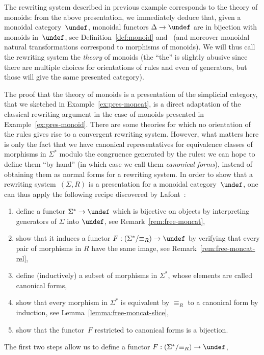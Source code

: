 \documentclass[submission,copyright,creativecommons]{eptcs}
\let\C\undef
\theoremstyle{definition}
\theoremstyle{remark}
\begin{document}
The rewriting system described in previous example corresponds to the theory of
monoids: from the above presentation, we immediately deduce that, given a
monoidal category~$\C$, monoidal functors $\Delta\to\C$ are in bijection with
monoids in~$\C$, see Definition~\ref{def:monoid} and~\cite{maclane:cwm} (and
moreover monoidal natural transformations correspond to morphisms of
monoids). We will thus call the rewriting system the \emph{theory} of monoids
(the ``the'' is slightly abusive since there are multiple choices for
orientations of rules and even of generators, but those will give the same
presented category).

The proof that the theory of monoids is a presentation of the simplicial
category, that we sketched in Example~\ref{ex:pres-moncat}, is a direct
adaptation of the classical rewriting argument in the case of monoids presented
in Example~\ref{ex:pres-monoid}. There are some theories for which no
orientation of the rules gives rise to a convergent rewriting system. However,
what matters here is only the fact that we have canonical representatives for
equivalence classes of morphisms in $\Sigma^*$ modulo the congruence generated
by the rules: we can hope to define them ``by hand'' (in which case we call them
\emph{canonical forms}), instead of obtaining them as normal forms for a
rewriting system. In order to show that a rewriting system~$(\Sigma,R)$ is a
presentation for a monoidal category~$\C$, one can thus apply the following
recipe discovered by Lafont~\cite{lafont2003towards}:
\begin{enumerate}
\item define a functor $\Sigma^*\to\C$ which is bijective on objects by
  interpreting generators of $\Sigma$ into $\C$, see
  Remark~\ref{rem:free-moncat},
\item show that it induces a functor $F:(\Sigma^*/{\equiv_R})\to\C$ by verifying
  that every pair of morphisms in $R$ have the same image, see
  Remark~\ref{rem:free-moncat-rel},
\item define (\eg inductively) a subset of morphisms in $\Sigma^*$, whose
  elements are called canonical forms,
\item show that every morphism in $\Sigma^*$ is equivalent by $\equiv_R$ to a
  canonical form by induction, see Lemma~\ref{lemma:free-moncat-slice},
\item show that the functor~$F$ restricted to canonical forms is a bijection.
\end{enumerate}
The first two steps allow us to define a functor $F:(\Sigma^*/{\equiv_R})\to\C$,
\end{document}
